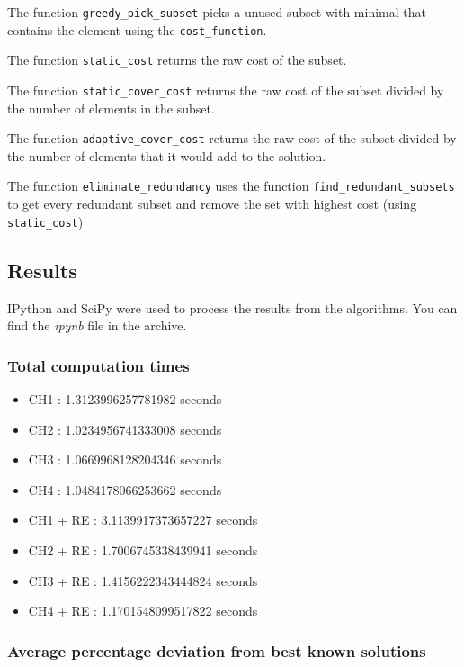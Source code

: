 \documentclass[a4paper,12pt]{article}
\begin{document}
The function \texttt{greedy\_pick\_subset} picks a unused subset with minimal that contains the element using the \texttt{cost\_function}.

The function \texttt{static\_cost} returns the raw cost of the subset.

The function \texttt{static\_cover\_cost} returns the raw cost of the subset divided by the number of elements in the subset.

The function \texttt{adaptive\_cover\_cost} returns the raw cost of the subset divided by the number of elements that it would add to the solution.

The function \texttt{eliminate\_redundancy} uses the function \texttt{find\_redundant\_subsets} to get every redundant subset and remove the set with highest cost (using \texttt{static\_cost})

\subsection{Results}

IPython and SciPy were used to process the results from the algorithms. You can find the \textit{ipynb} file in the archive.

\subsubsection{Total computation times}

\begin{itemize}
    \item CH1 : 1.3123996257781982 seconds
    \item CH2 : 1.0234956741333008 seconds
    \item CH3 : 1.0669968128204346 seconds
    \item CH4 : 1.0484178066253662 seconds
    \item CH1 + RE : 3.1139917373657227 seconds
    \item CH2 + RE : 1.7006745338439941 seconds
    \item CH3 + RE : 1.4156222343444824 seconds
    \item CH4 + RE : 1.1701548099517822 seconds
\end{itemize}

\subsubsection{Average percentage deviation from best known solutions}
\end{document}
